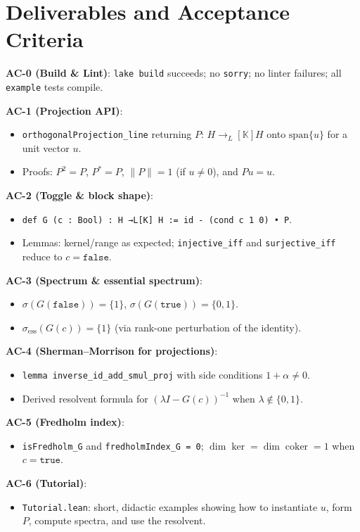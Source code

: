 \documentclass[11pt]{article}
\newcommand{\toL}{\to_L}  %
\begin{document}
\section{Deliverables and Acceptance Criteria}\label{sec:deliverables}

\begin{mdframed}
\textbf{AC-0 (Build \& Lint)}: \texttt{lake build} succeeds; no \texttt{sorry}; no linter failures; all \texttt{example} tests compile.

\textbf{AC-1 (Projection API)}:
\begin{itemize}
  \item \texttt{orthogonalProjection\_line} returning \(P:\,H\toL[\mathbb{K}]H\) onto \(\mathrm{span}\{u\}\) for a unit vector \(u\).
  \item Proofs: \(P^2=P\), \(P^\ast=P\), \(\|P\|=1\) (if \(u\neq 0\)), and \(P u = u\).
\end{itemize}

\textbf{AC-2 (Toggle \& block shape)}:
\begin{itemize}
  \item \texttt{def G (c : Bool) : H →L[K] H := id - (cond c 1 0) • P}.
  \item Lemmas: kernel/range as expected; \texttt{injective\_iff} and \texttt{surjective\_iff} reduce to \(c=\texttt{false}\).
\end{itemize}

\textbf{AC-3 (Spectrum \& essential spectrum)}:
\begin{itemize}
  \item \(\sigma(G(\texttt{false}))=\{1\}\), \(\sigma(G(\texttt{true}))=\{0,1\}\).
  \item \(\sigma_{\mathrm{ess}}(G(c))=\{1\}\) (via rank-one perturbation of the identity).
\end{itemize}

\textbf{AC-4 (Sherman--Morrison for projections)}:
\begin{itemize}
  \item \texttt{lemma inverse\_id\_add\_smul\_proj} with side conditions \(1+\alpha\neq 0\).
  \item Derived resolvent formula for \((\lambda I - G(c))^{-1}\) when \(\lambda\notin\{0,1\}\).
\end{itemize}

\textbf{AC-5 (Fredholm index)}:
\begin{itemize}
  \item \texttt{isFredholm\_G} and \texttt{fredholmIndex\_G = 0}; \(\dim \ker=\dim \operatorname{coker}=1\) when \(c=\texttt{true}\).
\end{itemize}

\textbf{AC-6 (Tutorial)}:
\begin{itemize}
  \item \texttt{Tutorial.lean}: short, didactic examples showing how to instantiate \(u\), form \(P\), compute spectra, and use the resolvent.
\end{itemize}
\end{mdframed}
\end{document}
